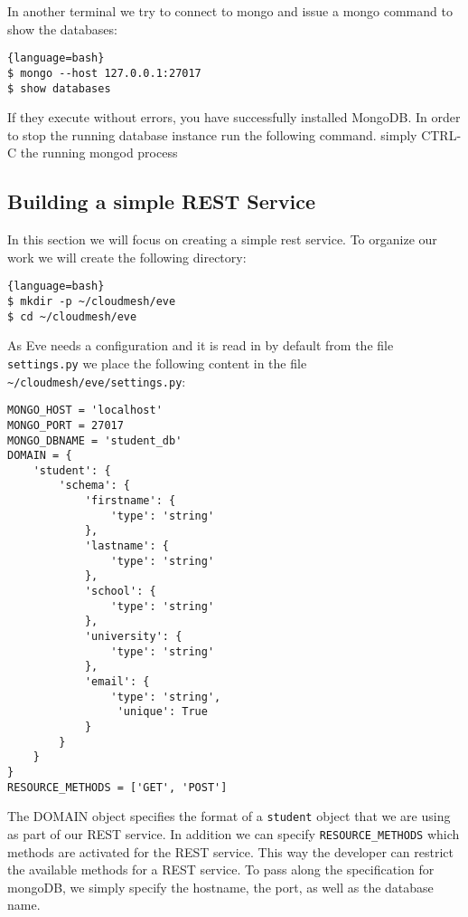 In another terminal we try to connect to mongo and issue a mongo
command to show the databases:

\begin{lstlisting}{language=bash}
$ mongo --host 127.0.0.1:27017
$ show databases
\end{lstlisting}

If they execute without errors, you have successfully installed
MongoDB. In order to stop the running database instance run the
following command. simply CTRL-C the running mongod process

\subsection{Building a simple REST Service}

In this section we will focus on creating a simple rest service. To
organize our work we will create the following directory:


\begin{lstlisting}{language=bash}
$ mkdir -p ~/cloudmesh/eve
$ cd ~/cloudmesh/eve
\end{lstlisting}

As Eve needs a configuration and it is read in by default from the
file \verb|settings.py| we place the following content in the file
\verb|~/cloudmesh/eve/settings.py|:

\begin{lstlisting}
MONGO_HOST = 'localhost'
MONGO_PORT = 27017
MONGO_DBNAME = 'student_db'
DOMAIN = {
    'student': {
        'schema': {
            'firstname': {
                'type': 'string'
            },
            'lastname': {
                'type': 'string'
            },
            'school': {
                'type': 'string'
            },
            'university': {
                'type': 'string'
            },
            'email': {
                'type': 'string',
                 'unique': True
            }
        }
    }
}
RESOURCE_METHODS = ['GET', 'POST']
\end{lstlisting}

The DOMAIN object specifies the format of a \verb|student| object that
we are using as part of our REST service.  In addition we can specify
\verb|RESOURCE_METHODS| which methods are activated for the REST
service. This way the developer can restrict the available methods for
a REST service. To pass along the specification for mongoDB, we simply
specify the hostname, the port, as well as the database name.

